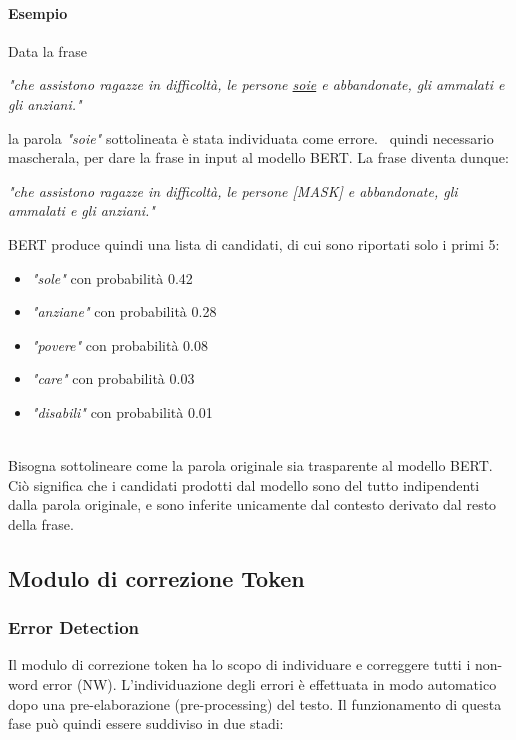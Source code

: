 \paragraph{Esempio} Data la frase 
\begin{center}
\textit{"che assistono ragazze in difficoltà, le persone \underline{soie} e abbandonate, gli ammalati e gli anziani."}
\end{center}
la parola \textit{"soie"} sottolineata è stata individuata come errore. \E\ quindi necessario mascherala, per dare la frase in input al modello BERT. La frase diventa dunque:
\begin{center}
\textit{"che assistono ragazze in difficoltà, le persone [MASK] e abbandonate, gli ammalati e gli anziani."}
\end{center}
BERT produce quindi una lista di candidati, di cui sono riportati solo i primi 5:
\begin{itemize}
\item \textit{"sole"} con probabilità 0.42
\item \textit{"anziane"} con probabilità 0.28
\item \textit{"povere"} con probabilità 0.08
\item \textit{"care"} con probabilità 0.03
\item \textit{"disabili"} con probabilità 0.01
\end{itemize}
\ \\
Bisogna sottolineare come la parola originale sia trasparente al modello BERT. Ciò significa che i candidati prodotti dal modello sono del tutto indipendenti dalla parola originale, e sono inferite unicamente dal contesto derivato dal resto della frase.\\




\subsection{Modulo di correzione Token}
\label{sec:met_tok_correct}

\subsubsection{Error Detection}
\label{sec:met_tok_errdet}
Il modulo di correzione token ha lo scopo di individuare e correggere tutti i non-word error (NW).  L'individuazione degli errori è effettuata in modo automatico dopo
una pre-elaborazione (pre-processing) del testo. Il funzionamento di questa
fase può quindi essere suddiviso in due stadi:


